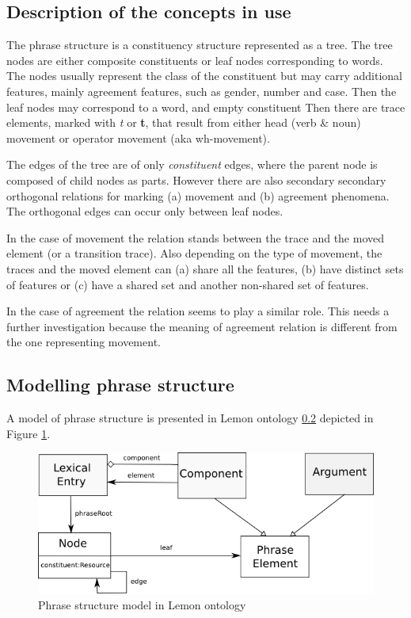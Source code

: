 \documentclass[11pt,a4paper,titlepage]{article}
\begin{document}
\subsection{Description of the concepts in use}
The phrase structure is a constituency structure represented as a tree. The tree nodes are either composite constituents or leaf nodes corresponding to words. The nodes usually represent the class of the constituent but may carry additional features, mainly agreement features, such as gender, number and case. Then the leaf nodes may correspond to a word, and empty constituent
Then there are trace elements, marked with \textit{t} or \textbf{t}, that result from either head (verb \& noun) movement or operator movement (aka wh-movement).

The edges of the tree are of only \textit{constituent} edges, where the parent node is composed of child nodes as parts. However there are also secondary secondary orthogonal relations for marking (a) movement and (b) agreement phenomena. The orthogonal edges can occur only between leaf nodes.

In the case of movement the relation stands between the trace and the moved element (or a transition trace).  Also depending on the type of movement, the traces and the moved element can (a) share all the features, (b) have distinct sets of features or (c) have a shared set and another non-shared set of features.

In the case of agreement the relation seems to play a similar role. This needs a further investigation because the meaning of agreement relation is different from the one representing movement. 

\subsection{Modelling phrase structure}
A model of phrase structure is presented in Lemon ontology \ref{} depicted in Figure \ref{fig:ps-lemon}. 

\begin{figure}[H]
	\centering
	\includegraphics[width=\linewidth]{pics/lemon-ps-model}
	
	\caption{Phrase structure model in Lemon ontology}
	\label{fig:ps-lemon}
\end{figure}
\end{document}
